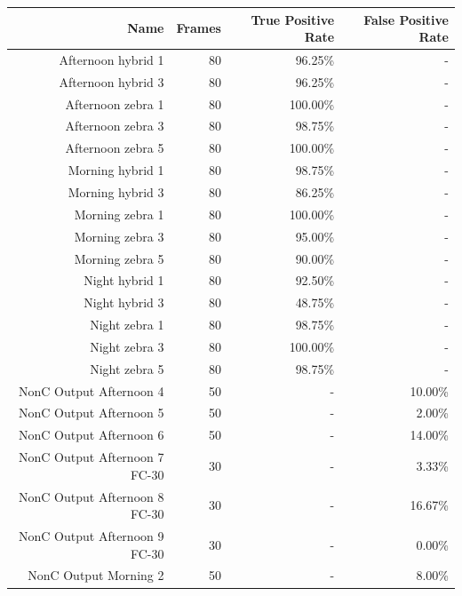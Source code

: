 \documentclass[12pt]{ucthesis}
\begin{document}
\begin{center}
    \begin{longtable}{| r | r | r | r |}
    \hline
    Name & Frames & True Positive Rate & False Positive Rate \bigstrut\\
    \hline
    Afternoon hybrid 1 & 80 & 96.25\% & - \bigstrut\\
    \hline
    Afternoon hybrid 3 & 80 & 96.25\% & - \bigstrut\\
    \hline
    Afternoon zebra 1 & 80 & 100.00\% & - \bigstrut\\
    \hline
    Afternoon zebra 3 & 80 & 98.75\% & - \bigstrut\\
    \hline
    Afternoon zebra 5 & 80 & 100.00\% & - \bigstrut\\
    \hline
    Morning hybrid 1 & 80 & 98.75\% & - \bigstrut\\
    \hline
    Morning hybrid 3 & 80 & 86.25\% & - \bigstrut\\
    \hline
    Morning zebra 1 & 80 & 100.00\% & - \bigstrut\\
    \hline
    Morning zebra 3 & 80 & 95.00\% & - \bigstrut\\
    \hline
    Morning zebra 5 & 80 & 90.00\% & - \bigstrut\\
    \hline
    Night hybrid 1 & 80 & 92.50\% & - \bigstrut\\
    \hline
    Night hybrid 3 & 80 & 48.75\% & - \bigstrut\\
    \hline
    Night zebra 1 & 80 & 98.75\% & - \bigstrut\\
    \hline
    Night zebra 3 & 80 & 100.00\% & - \bigstrut\\
    \hline
    Night zebra 5 & 80 & 98.75\% & - \bigstrut\\
    \hline
    NonC Output Afternoon 4 & 50 & -  & 10.00\% \bigstrut\\
    \hline
    NonC Output Afternoon 5 & 50 & -  & 2.00\% \bigstrut\\
    \hline
    NonC Output Afternoon 6 & 50 & -  & 14.00\% \bigstrut\\
    \hline
    NonC Output Afternoon 7 FC-30 & 30 & -  & 3.33\% \bigstrut\\
    \hline
    NonC Output Afternoon 8 FC-30 & 30 & -  & 16.67\% \bigstrut\\
    \hline
    NonC Output Afternoon 9 FC-30 & 30 & -  & 0.00\% \bigstrut\\
    \hline
    NonC Output Morning 2 & 50 & -  & 8.00\% \bigstrut\\
    \hline

\end{longtable}
\end{center}
\end{document}
